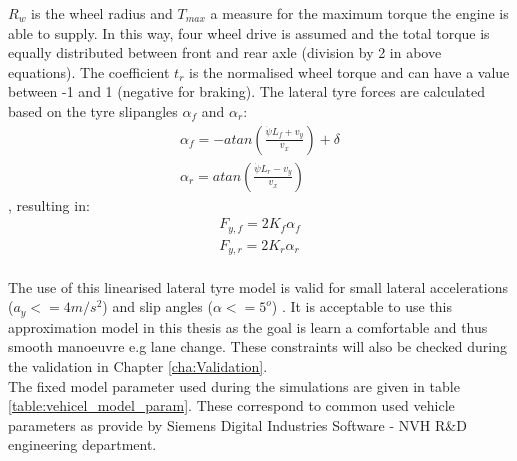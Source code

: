 $R_w$ is the wheel radius and $T_{max}$ a measure for the maximum torque the engine is able to supply. In this way, four wheel drive is assumed and the total torque is equally distributed between front and rear axle (division by 2 in above equations). The coefficient $t_r$ is the normalised wheel torque and can have a value between -1 and 1 (negative for braking).
The lateral tyre forces are calculated based on the tyre slipangles $\alpha_f$ and $\alpha_r$:
\begin{equation}\label{eq:bicycle_slipangle}
\begin{aligned}
\alpha_f = -atan(\frac{\dot{\psi} L_f + v_y}{v_x}) + \delta\\
\alpha_r = atan(\frac{\dot{\psi} L_r - v_y}{v_x})
\end{aligned}
\end{equation},
resulting in:
\begin{equation}\label{eq:bicycle_Fy}
\begin{aligned}
F_{y,f} = 2 K_f \alpha_f\\
F_{y,r} = 2 K_r \alpha_r
\end{aligned}
\end{equation}\\
The use of this linearised lateral tyre model is valid for small lateral accelerations ($a_y <= 4 m/s^2$) and slip angles ($\alpha <= 5^o$) \cite{TongDuySon2019}. It is acceptable to use this approximation model in this thesis as the goal is learn a comfortable and thus smooth manoeuvre e.g lane change. These constraints will also be checked during the validation in Chapter \ref{cha:Validation}.\\

The fixed model parameter used during the simulations are given in table \ref{table:vehicel_model_param}. These correspond to common used vehicle parameters as provide by Siemens Digital Industries Software - NVH R\&D engineering department.

